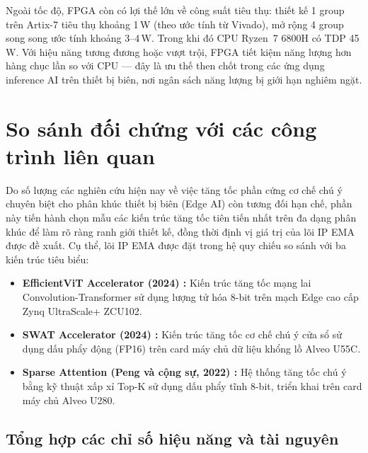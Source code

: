 \documentclass{uetgraduation}
\begin{document}
Ngoài tốc độ, FPGA còn có lợi thế lớn về công suất tiêu thụ: thiết kế 1 group
trên Artix-7 tiêu thụ khoảng 1\,W (theo ước tính từ Vivado), mở rộng 4 group
song song ước tính khoảng 3--4\,W. Trong khi đó CPU Ryzen~7 6800H có TDP 45\,W.
Với hiệu năng tương đương hoặc vượt trội, FPGA tiết kiệm năng lượng hơn hàng
chục lần so với CPU --- đây là ưu thế then chốt trong các ứng dụng inference AI
trên thiết bị biên, nơi ngân sách năng lượng bị giới hạn nghiêm ngặt.

\section{So sánh đối chứng với các công trình liên quan}
\label{sec:so_sanh}

Do số lượng các nghiên cứu hiện nay về việc tăng tốc phần cứng cơ chế chú ý chuyên biệt cho phân khúc thiết bị biên (Edge AI) còn tương đối hạn chế, phần này tiến hành chọn mẫu các kiến trúc tăng tốc tiên tiến nhất trên đa dạng phân khúc để làm rõ ràng ranh giới thiết kế, đồng thời định vị giá trị của lõi IP EMA được đề xuất.
Cụ thể, lõi IP EMA được đặt trong hệ quy chiếu so sánh với ba kiến trúc tiêu biểu:
\begin{itemize}
    \item \textbf{EfficientViT Accelerator (2024) \cite{efficientvit_acc}:} Kiến trúc tăng tốc mạng lai Convolution-Transformer sử dụng lượng tử hóa 8-bit trên mạch Edge cao cấp Zynq UltraScale+ ZCU102.
    \item \textbf{SWAT Accelerator (2024) \cite{swat_acc}:} Kiến trúc tăng tốc cơ chế chú ý cửa sổ sử dụng dấu phẩy động (FP16) trên card máy chủ dữ liệu khổng lồ Alveo U55C.
    \item \textbf{Sparse Attention (Peng và cộng sự, 2022) \cite{peng2022_sparse}:} Hệ thống tăng tốc chú ý bằng kỹ thuật xấp xỉ Top-K sử dụng dấu phẩy tĩnh 8-bit, triển khai trên card máy chủ Alveo U280.
\end{itemize}

\subsection{Tổng hợp các chỉ số hiệu năng và tài nguyên}
\end{document}

